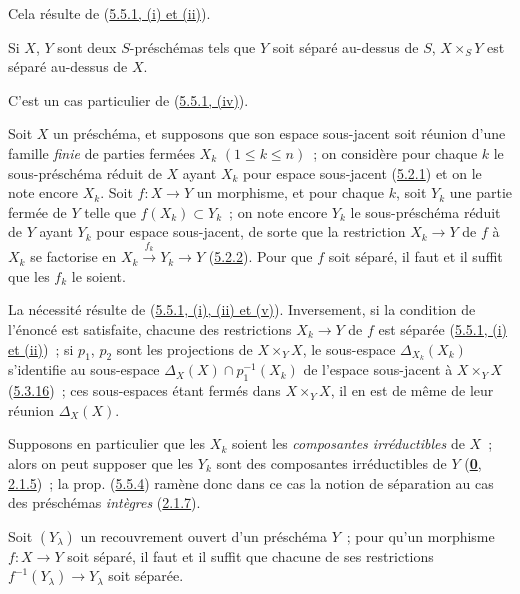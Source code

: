 Cela résulte de (\hyperref[I.5.5.1-fr]{5.5.1, (i) et (ii)}).

\begin{corollary}[5.5.3]
\label{I.5.5.3-fr}
Si $X$, $Y$ sont deux $S$-préschémas tels que $Y$ soit séparé au-dessus de
$S$, $X\times_S Y$ est séparé au-dessus de $X$.
\end{corollary}

C'est un cas particulier de (\hyperref[I.5.5.1-fr]{5.5.1, (iv)}).

\begin{proposition}[5.5.4]
\label{I.5.5.4-fr}
Soit $X$ un préschéma, et supposons que son espace sous-jacent soit réunion
d'une famille \emph{finie} de parties fermées $X_k$ $(1\leq k\leq n)$~; on considère
pour chaque $k$ le sous-préschéma réduit de $X$ ayant $X_k$ pour espace
sous-jacent \textup{(\hyperref[I.5.2.1-fr]{5.2.1})} et on le note encore $X_k$. Soit
$f:X\to Y$ un morphisme, et pour chaque $k$, soit $Y_k$ une partie fermée de
$Y$ telle que $f(X_k)\subset Y_k$~; on note encore $Y_k$ le sous-préschéma
réduit de $Y$ ayant $Y_k$ pour espace sous-jacent, de sorte que la restriction
$X_k\to Y$ de $f$ à $X_k$ se factorise en
$X_k\xrightarrow{f_k}Y_k\to Y$ \textup{(\hyperref[I.5.2.2-fr]{5.2.2})}. Pour que $f$
soit séparé, il faut et il suffit que les $f_k$ le soient.
\end{proposition}

La nécessité résulte de
(\hyperref[I.5.5.1-fr]{5.5.1, (i), (ii) et (v)}). Inversement, si la condition
de l'énoncé est satisfaite, chacune des restrictions $X_k\to Y$ de $f$ est
séparée (\hyperref[I.5.5.1-fr]{5.5.1, (i) et (ii)})~; si $p_1$, $p_2$ sont les
projections de $X\times_Y X$, le sous-espace $\Delta_{X_k}(X_k)$ s'identifie
au sous-espace $\Delta_X(X)\cap p_1^{-1}(X_k)$ de l'espace sous-jacent à
$X\times_Y X$ (\hyperref[I.5.3.16-fr]{5.3.16})~; ces sous-espaces étant
fermés dans $X\times_Y X$, il en est de même de leur réunion $\Delta_X(X)$.

Supposons en particulier que les $X_k$ soient les
\emph{composantes irréductibles} de $X$~; alors on peut supposer que les $Y_k$
sont des composantes irréductibles de $Y$
(\hyperref[0.2.1.5-fr]{\textbf{0}, 2.1.5})~; la prop.
(\hyperref[I.5.5.4-fr]{5.5.4}) ramène donc dans ce cas la notion de séparation
au cas des préschémas \emph{intègres} (\hyperref[I.2.1.7-fr]{2.1.7}).


\begin{proposition}[5.5.5]
\label{I.5.5.5-fr}
Soit $(Y_\lambda)$ un recouvrement ouvert d'un préschéma $Y$~; pour qu'un
morphisme $f:X\to Y$ soit séparé, il faut et il suffit que chacune de ses
restrictions $f^{-1}(Y_\lambda)\to Y_\lambda$ soit séparée.
\end{proposition}

